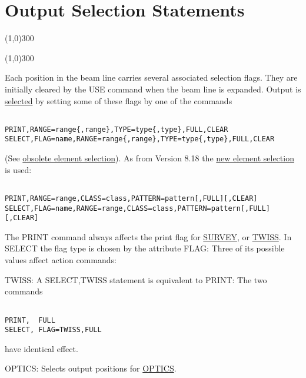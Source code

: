 





\section{Output Selection Statements}

\line(1,0){300}

\line(1,0){300}

  Each position in the beam line carries several associated selection flags. They are initially cleared by the USE command when the beam line is expanded. Output is \href{ranges.html}{selected} by setting some of these flags  by one of the commands 
\begin{verbatim}

PRINT,RANGE=range{,range},TYPE=type{,type},FULL,CLEAR
SELECT,FLAG=name,RANGE=range{,range},TYPE=type{,type},FULL,CLEAR
\end{verbatim} (See \href{ranges.html}{obsolete element selection}). As from Version 8.18 the \href{new_select.html}{new element selection} is used: 
\begin{verbatim}

PRINT,RANGE=range,CLASS=class,PATTERN=pattern[,FULL][,CLEAR]
SELECT,FLAG=name,RANGE=range,CLASS=class,PATTERN=pattern[,FULL][,CLEAR]
\end{verbatim} The PRINT command always affects the print flag for \href{survey.html}{SURVEY}, or \href{survey.html}{TWISS}. In SELECT the flag type is chosen by the attribute FLAG: Three of its possible values affect action commands: 

TWISS: A SELECT,TWISS statement is equivalent to PRINT: The two commands 
\begin{verbatim}

PRINT,  FULL
SELECT, FLAG=TWISS,FULL
\end{verbatim} have identical effect. 

OPTICS: Selects output positions for \href{optics.html}{OPTICS}. 

